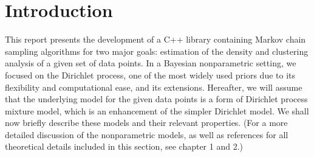 \section{Introduction}
This report presents the development of a C++ library containing Markov chain sampling algorithms for two major goals: estimation of the density and clustering analysis of a given set of data points.
In a Bayesian nonparametric setting, we focused on the Dirichlet process, one of the most widely used priors due to its flexibility and computational ease, and its extensions.
Hereafter, we will assume that the underlying model for the given data points is a form of Dirichlet process mixture model, which is an enhancement of the simpler Dirichlet model.
We shall now briefly describe these models and their relevant properties.
(For a more detailed discussion of the nonparametric models, as well as references for all theoretical details included in this section, see \cite{book} chapter 1 and 2.)


